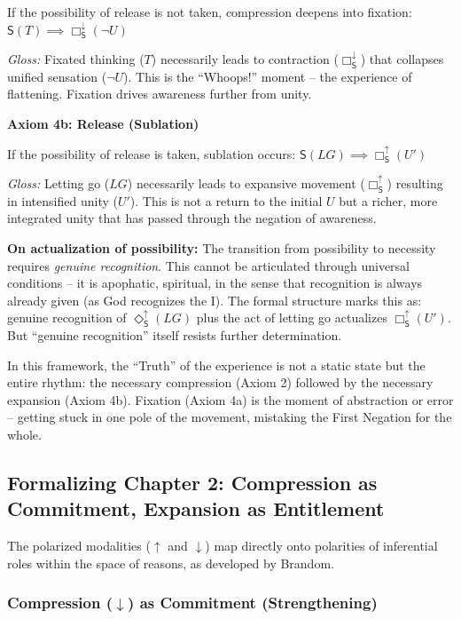 \documentclass[12pt]{book}
\newcommand{\SBoxUp}{\Box_{\mathsf{S}}^{\uparrow}}
\newcommand{\SBoxDown}{\Box_{\mathsf{S}}^{\downarrow}}
\begin{document}
If the possibility of release is not taken, compression deepens into fixation:
$ \mathsf{S}(T) \implies \SBoxDown(\neg U) $

\textit{Gloss:} Fixated thinking ($T$) necessarily leads to contraction ($\SBoxDown$) that collapses unified sensation ($\neg U$). This is the ``Whoops!'' moment -- the experience of flattening. Fixation drives awareness further from unity.

\bigskip

\noindent\textbf{Axiom 4b: Release (Sublation)}

If the possibility of release is taken, sublation occurs:
$ \mathsf{S}(LG) \implies \SBoxUp(U') $

\textit{Gloss:} Letting go ($LG$) necessarily leads to expansive movement ($\SBoxUp$) resulting in intensified unity ($U'$). This is not a return to the initial $U$ but a richer, more integrated unity that has passed through the negation of awareness.

\bigskip

\textbf{On actualization of possibility:} The transition from possibility to necessity requires \textit{genuine recognition}. This cannot be articulated through universal conditions -- it is apophatic, spiritual, in the sense that recognition is always already given (as God recognizes the I). The formal structure marks this as: genuine recognition of $\Diamond_{\mathsf{S}}^{\uparrow}(LG)$ plus the act of letting go actualizes $\Box_{\mathsf{S}}^{\uparrow}(U')$. But ``genuine recognition'' itself resists further determination.

In this framework, the ``Truth'' of the experience is not a static state but the entire rhythm: the necessary compression (Axiom 2) followed by the necessary expansion (Axiom 4b). Fixation (Axiom 4a) is the moment of abstraction or error -- getting stuck in one pole of the movement, mistaking the First Negation for the whole.

\subsection{Formalizing Chapter 2: Compression as Commitment, Expansion as Entitlement}

The polarized modalities ($\uparrow$ and $\downarrow$) map directly onto polarities of inferential roles within the space of reasons, as developed by Brandom.

\subsubsection{Compression ($\downarrow$) as Commitment (Strengthening)}
\end{document}
